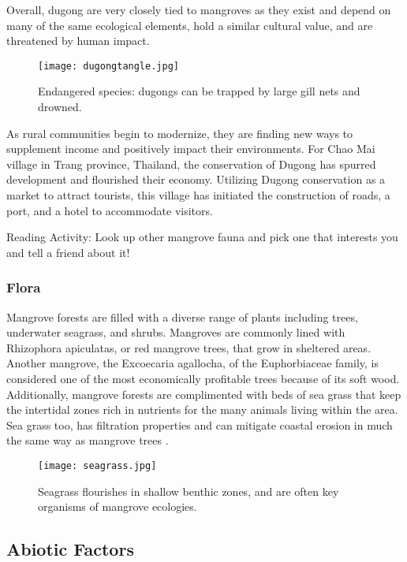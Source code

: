   Overall, dugong are very closely tied to mangroves as they exist and depend on many of the same ecological elements, hold a similar cultural value, and are threatened by human impact.


\begin{figure}[!h]
    \centering
    \texttt{[image: dugongtangle.jpg]}
    \caption {Endangered species: dugongs can be trapped by large gill nets and drowned.}
    \label{fig:dugongtangle}
\end{figure}


  As rural communities begin to modernize, they are finding new ways to supplement income and positively impact their environments. For Chao Mai village in Trang province, Thailand, the conservation of Dugong has spurred development and flourished their economy. Utilizing Dugong conservation as a market to attract tourists, this village has initiated the construction of roads, a port, and a hotel to accommodate visitors. 

Reading Activity: Look up other mangrove fauna and pick one that interests you and tell a friend about it!  

\subsubsection{Flora}
Mangrove forests are filled with a diverse range of plants including trees, underwater seagrass, and shrubs. Mangroves are commonly lined with Rhizophora apiculatas, or red mangrove trees, that grow in sheltered areas. Another mangrove, the Excoecaria agallocha, of the Euphorbiaceae family, is considered one of the most  economically profitable trees because of its soft wood. Additionally, mangrove forests are complimented with beds of sea grass that keep the intertidal zones rich in nutrients for the many animals living within the area. Sea grass too, has filtration properties and can mitigate coastal erosion in much the same way as mangrove trees \citep{hoegh1999climate}. 

\begin{figure}[!h]
    \centering
    \texttt{[image: seagrass.jpg]}
    \caption {Seagrass flourishes in shallow benthic zones, and are often key organisms of mangrove ecologies.}
    \label{fig:seagrass}
\end{figure}


\subsection{Abiotic Factors}

